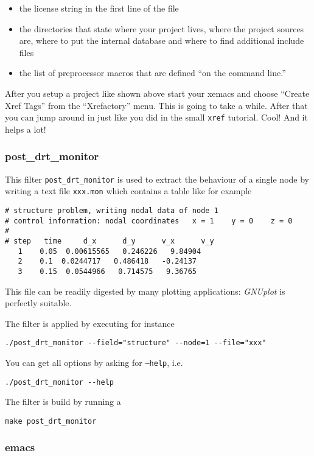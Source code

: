 \begin{itemize}
\item the license string in the first line of the file
\item the directories that state where your project lives, where the project
sources are, where to put the internal database and where to find
additional include files
\item the list of preprocessor macros that are defined {}``on the command
line.''
\end{itemize}
After you setup a project like shown above start your xemacs and choose
{}``Create Xref Tags'' from the {}``Xrefactory'' menu. This is
going to take a while. After that you can jump around in \ccarat{}
just like you did in the small \texttt{xref} tutorial. Cool! And it
helps a lot!

\subsubsection{post\_drt\_monitor}

This filter \texttt{post\_drt\_monitor} is used to extract the behaviour of a
single node by writing a
text file \texttt{xxx.mon} which contains a table like
for example
\begin{verbatim}
# structure problem, writing nodal data of node 1
# control information: nodal coordinates   x = 1    y = 0    z = 0
#
# step   time     d_x      d_y      v_x      v_y
   1    0.05  0.00615565   0.246226   9.84904
   2    0.1  0.0244717   0.486418   -0.24137
   3    0.15  0.0544966   0.714575   9.36765
\end{verbatim}
This file can be readily digested by many plotting applications:
\emph{GNUplot} is perfectly suitable.

The filter is applied by
executing for instance
\begin{verbatim}
./post_drt_monitor --field="structure" --node=1 --file="xxx"
\end{verbatim}

You can get all options by asking for \texttt{--help}, i.e.\@
\begin{verbatim}
./post_drt_monitor --help
\end{verbatim}


The filter is build by running a
\begin{verbatim}
make post_drt_monitor
\end{verbatim}


\subsubsection{emacs}

